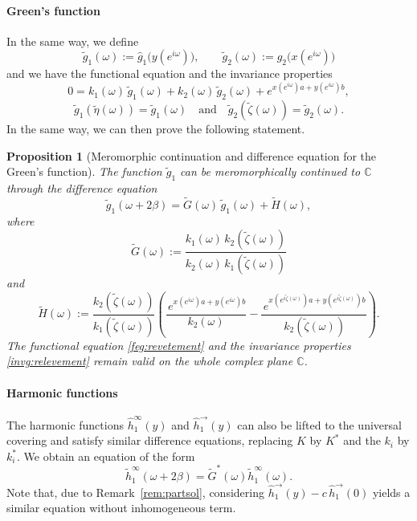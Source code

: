 \documentclass[11pt]{article}
\newtheorem{prop}[thm]{Proposition}
\theoremstyle{definition}
\begin{document}
\paragraph{Green's function}
In the same way, we define
\[
\widetilde{g}_1(\omega):=\widehat{g}_1\bigl(y(e^{i\omega})\bigr),
\qquad
\widetilde{g}_2(\omega):=\widehat{g}_2\bigl(x(e^{i\omega})\bigr)
\]
and we have the functional equation and the invariance properties
\begin{equation}
0
=
k_1(\omega)\,
\widetilde{g}_1(\omega)
+
k_2(\omega)\,
\widetilde{g}_2(\omega)
+e^{x(e^{i\omega})a+y(e^{i\omega})b},
\label{feg:revetement}
\end{equation}
\begin{equation}
\widetilde{g}_1(\widetilde{\eta}(\omega))=\widetilde{g}_1(\omega)
\quad\text{and}\quad
\widetilde{g}_2(\widetilde{\zeta}(\omega))=\widetilde{g}_2(\omega)
.
\label{invg:relevement}
\end{equation}
In the same way, we can then prove the following statement.
\begin{prop}[Meromorphic continuation and difference equation for the Green's function]
The function $\widetilde g_1$ can be meromorphically continued to $\mathbb{C}$ through the difference equation
\begin{equation}
\widetilde g_1(\omega+2\beta)
=
\widetilde G(\omega)\,\widetilde g_1(\omega)
+
\widetilde H(\omega),
\label{eq:diffrel_green}
\end{equation}
where
\[
\widetilde G(\omega)
:=
\frac{k_1(\omega)\,k_2(\widetilde\zeta(\omega))}
{k_2(\omega)\,k_1(\widetilde\zeta(\omega))}
\]
and
\begin{equation}
\widetilde H(\omega)
:=
\frac{k_2(\widetilde\zeta(\omega))}{k_1(\widetilde\zeta(\omega))
} \left(
\frac{
\,e^{x(e^{i\omega})a+y(e^{i\omega})b}}{k_2(\omega)}
-
\frac{\,e^{x(e^{i\widetilde\zeta(\omega)})a+
y(e^{i\widetilde\zeta(\omega)})b}
}{
\,k_2(\widetilde\zeta(\omega))} \right) .
\label{tildeH}
\end{equation}
The functional equation \eqref{feg:revetement} and the invariance properties \eqref{invg:relevement} remain valid on the whole complex plane $\mathbb{C}$.
\end{prop}

\paragraph{Harmonic functions}
The harmonic functions $\widehat h^\infty_1(y)$ and $\widehat h^\rightarrow_1(y)$ can also be lifted to the universal covering and satisfy similar difference equations, replacing $K$ by $K^*$ and the $k_i$ by $k_i^*$. We obtain an equation of the form
$$
\widetilde h^\infty_1(\omega+2\beta)=\widetilde G^*(\omega) \widetilde h^\infty_1(\omega).
$$
Note that, due to Remark~\ref{rem:partsol}, considering $\widehat h^\rightarrow_1(y)-c\,\widehat h^\rightarrow_1(0)$ yields a similar equation without inhomogeneous term.
\end{document}
